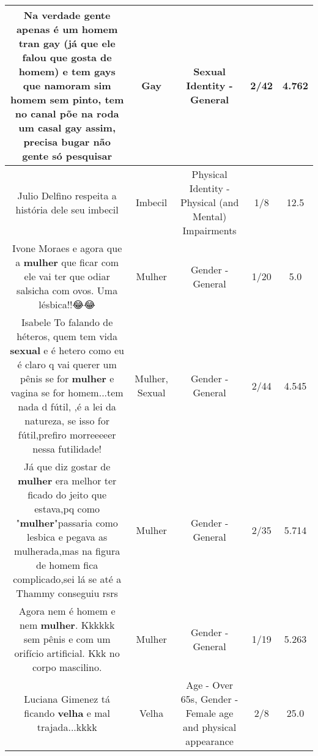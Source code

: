 \documentclass[11pt]{article}
\newlength\mylength
\begin{document}
\begin{center}
\begin{longtable}{|C{.65\mylength}|C{.30\mylength}|C{.12\mylength}|C{.12\mylength}|C{.12\mylength}|}
  \small Na verdade gente  apenas é um homem tran \textbf{gay} (já que ele falou que gosta de homem) e tem gays que namoram sim homem sem pinto, tem no canal põe na roda um casal \textbf{gay} assim, precisa bugar não gente só pesquisar\normalsize   & Gay & Sexual Identity - General & 2/42 & 4.762 \\  \hline
  \small Julio Delfino  respeita a história dele seu imbecil\normalsize   & Imbecil & Physical Identity - Physical (and Mental) Impairments & 1/8 & 12.5 \\  \hline
  \small Ivone Moraes e agora que a \textbf{mulher} que ficar com ele vai ter que odiar salsicha com ovos. Uma lésbica!!😂😂\normalsize   & Mulher & Gender - General & 1/20 & 5.0 \\  \hline
  \small Isabele To falando de héteros, quem tem vida \textbf{sexual} e é hetero como eu é claro q vai querer um pênis se for \textbf{mulher} e vagina se for  homem...tem nada d fútil, ,é a lei da natureza, se isso for fútil,prefiro morreeeeer nessa futilidade!\normalsize   & Mulher, Sexual & Gender - General & 2/44 & 4.545 \\  \hline
  \small Já que diz gostar de \textbf{mulher} era melhor ter ficado do jeito que estava,pq como "\textbf{mulher}"passaria como lesbica e pegava as mulherada,mas na figura de homem fica complicado,sei lá se até a Thammy conseguiu rsrs\normalsize   & Mulher & Gender - General & 2/35 & 5.714 \\  \hline
  \small Agora nem é homem e nem \textbf{mulher}. Kkkkkk  sem pênis e com um orifício artificial.  Kkk no corpo mascilino.\normalsize   & Mulher & Gender - General & 1/19 & 5.263 \\  \hline
  \small Luciana Gimenez tá ficando \textbf{v\textbf{elha}} e mal trajada...kkkk\normalsize   & Velha & Age - Over 65s, Gender - Female age and physical appearance & 2/8 & 25.0 \\  \hline

\end{longtable}
\end{center}
\end{document}
